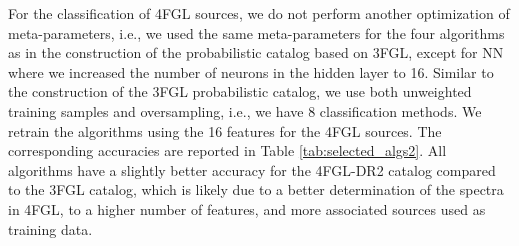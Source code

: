 For the classification of 4FGL sources, we do not perform another optimization of meta-parameters, i.e., we used the same meta-parameters for the four algorithms as in the construction of the probabilistic catalog based on 3FGL, except for NN where we increased the number of neurons in the hidden layer to 16. Similar to the construction of the 3FGL probabilistic catalog, we use both unweighted training samples and oversampling, i.e., we have 8 classification methods.
We retrain the algorithms using the 16 features for the 4FGL sources.
The corresponding accuracies are reported in Table \ref{tab:selected_algs2}.
All algorithms have a slightly better accuracy for the 4FGL-DR2 catalog compared to the 3FGL catalog, which is likely due to a better determination of the spectra in 4FGL, to a higher number of features, and more associated sources used as training data. 


